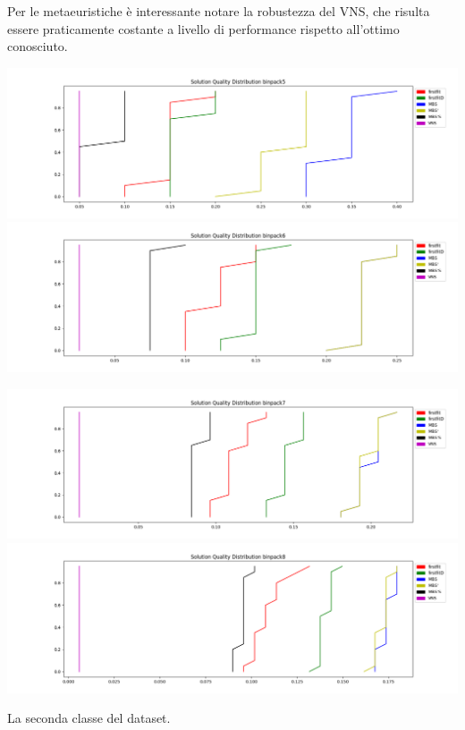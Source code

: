 \documentclass{article}
\begin{document}
Per le metaeuristiche è interessante notare la robustezza del VNS, che risulta essere praticamente costante a livello di performance rispetto all'ottimo conosciuto.
\begin{table}[H]
\includegraphics[scale=0.23]{pic/binpack5}
\includegraphics[scale=0.23]{pic/binpack6}

\includegraphics[scale=0.23]{pic/binpack7}
\includegraphics[scale=0.23]{pic/binpack8}
\caption{La seconda classe del dataset.}
\end{table}
\end{document}
